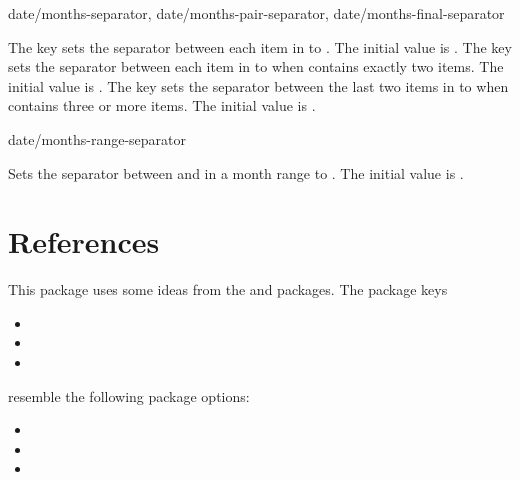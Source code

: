\documentclass{beery}
\begin{document}
\begin{variable}
  {
    date/months-separator,
    date/months-pair-separator,
    date/months-final-separator
  }
  \begin{syntax}
  \end{syntax}
  The key  sets the separator between each item in  to .
  The initial value is \key{=,\textvisiblespace}.
  The key  sets the separator between each item in  to  when  contains exactly two items.
  The initial value is .
  The key  sets the separator between the last two items in  to  when  contains three or more items.
  The initial value is .
\end{variable}

\begin{variable}{date/months-range-separator}
  \begin{syntax}
  \end{syntax}
  Sets the separator between  and  in a month range to .
  The initial value is .
\end{variable}


\section{References}
\label{sec:references}

This package uses some ideas from the  and  packages.
The  package keys
\begin{itemize}
  \item {}
  \item {}
  \item {}
\end{itemize}
resemble the following  package options:
\begin{itemize}
  \item {}
  \item {}
  \item {}
\end{itemize}
\end{document}

